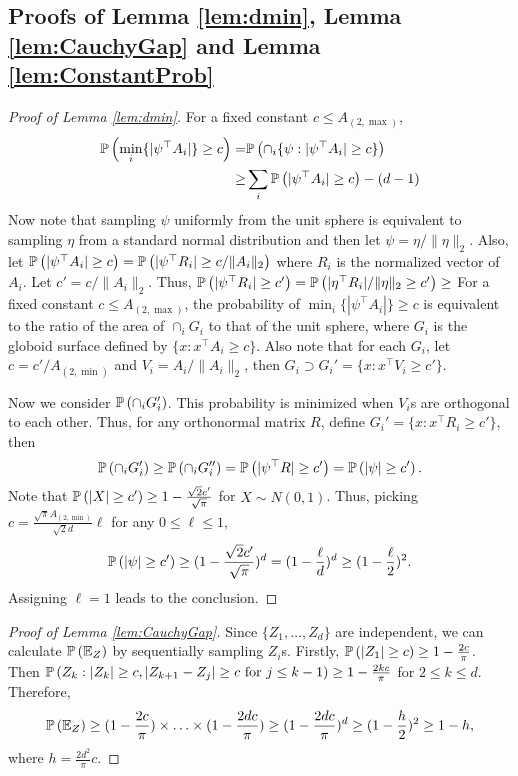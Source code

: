 \subsection{Proofs of Lemma \ref{lem:dmin}, Lemma \ref{lem:CauchyGap} and Lemma \ref{lem:ConstantProb}}
\begin{proof}[Proof of Lemma \ref{lem:dmin}]
For a fixed constant $c \le A_{(2,\max)}$,
\begin{align*}
\mathbb{P}\left(\min_i \{|\psi^{\top}A_i|\} \ge c\right) = & \mathbb{P}\left(\cap_i\{\psi : |\psi^{\top}A_i|\ge c\}\right)\\
 \ge & \sum_i \mathbb{P}\left(|\psi^{\top}A_i|\ge c\right) - (d-1)
\end{align*}
Now note that sampling $\psi$ uniformly from the unit sphere is equivalent to sampling $\eta$ from a standard normal distribution and then let $\psi = \eta/ \|\eta\|_2$.
Also, let $\mathbb{P}\left(|\psi^{\top}A_i|\ge c\right) = \mathbb{P}\left(|\psi^{\top}R_i|\ge c/\|A_i\|_2\right)$ where $R_i$ is the normalized vector of $A_i$. 
Let $c' = c/\|A_i\|_2$. 
Thus, $ \mathbb{P}\left(|\psi^{\top}R_i|\ge c'\right) = \mathbb{P}\left(|\eta^{\top}R_i|/\|\eta\|_2\ge c'\right) \ge $
\fi
For a fixed constant $c \le A_{(2,\max)}$, the probability of $\min_i \{|\psi^{\top}A_i|\} \ge c$ is equivalent to the ratio of the area of $\cap_i G_i$ to that of the unit sphere, where $G_i$ is the globoid surface defined by $\{x: x^{\top}A_i\ge c\}$.  
Also note that for each $G_i$, let $c = c'/A_{(2,\min)}$ and $V_i = A_i/\|A_i\|_2$, then $G_i \supset G_i' = \{x: x^{\top}V_i\ge c'\}$.

Now we consider $\mathbb{P}\left(\cap_i G_i'\right)$. 
This probability is minimized when $V_i$s are orthogonal to each other. 
Thus, for any orthonormal matrix $R$, define $G_i' = \{x: x^{\top}R_i\ge c'\}$, then 
\[
\mathbb{P}\left(\cap_i G_i'\right) \ge \mathbb{P}\left(\cap_i G_i''\right) = \mathbb{P}\left(|\psi^{\top}R| \ge c'\right) = \mathbb{P}\left(|\psi| \ge c'\right).
\]
Note that $\mathbb{P}\left(|X|\ge c'\right) \ge 1- \frac{\sqrt{2}c'}{\sqrt{\pi}}$ for $X\sim N(0,1)$. Thus, picking $c = \frac{\sqrt{\pi}A_{(2,\min)}}{\sqrt{2}d} \ell$ for any $0\le \ell \le 1$, 
\begin{equation}
\label{eq:GaussianLowerBound}
\mathbb{P}\left(|\psi| \ge c'\right) \ge (1- \frac{\sqrt{2}c'}{\sqrt{\pi}})^d = (1-\frac{\ell}{d})^d \ge (1-\frac{\ell}{2})^2.
\end{equation}
Assigning $\ell=1$ leads to the conclusion. 
\end{proof}

\begin{proof}[Proof of Lemma \ref{lem:CauchyGap}]
Since $\{Z_1,\ldots, Z_d\}$ are independent, we can calculate $\mathbb{P}\left(\mathbb{E}_{Z}\right)$ by sequentially sampling $Z_i$s. 
Firstly, $\mathbb{P}\left(|Z_1|\ge c\right) \ge 1-\frac{2c}{\pi}$. 
Then $\mathbb{P}\left(Z_{k}: |Z_{k}|\ge c, |Z_{k+1}- Z_j|\ge c \text{ for } j\le k-1\right) \ge 1-\frac{2kc}{\pi}$ for $2 \le k\le d$.
Therefore,
\begin{equation}
\label{eq:ProbEZ}
\mathbb{P}\left(\mathbb{E}_{Z}\right) \ge (1-\frac{2c}{\pi})\times \ldots \times (1-\frac{2dc}{\pi}) \ge (1-\frac{2dc}{\pi})^d \ge (1-\frac{h}{2})^2 \ge 1-h,
\end{equation}
where $h = \frac{2d^2}{\pi}c$. 
\end{proof}

